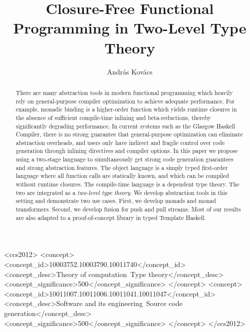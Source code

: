 \documentclass[acmsmall,screen,review,anonymous]{acmart}
\theoremstyle{remark}
\begin{document}
\title{Closure-Free Functional Programming in Two-Level Type Theory}

\author{András Kovács}

\begin{abstract}
There are many abstraction tools in modern functional programming which heavily
rely on general-purpose compiler optimization to achieve adequate
performance. For example, monadic binding is a higher-order function which
yields runtime closures in the absence of sufficient compile-time inlining and
beta-reductions, thereby significantly degrading performance. In current systems
such as the Glasgow Haskell Compiler, there is no strong guarantee that
general-purpose optimization can eliminate abstraction overheads, and users only
have indirect and fragile control over code generation through inlining
directives and compiler options. In this paper we propose using a two-stage
language to simultaneously get strong code generation guarantees and strong
abstraction features. The object language is a simply typed first-order language
where all function calls are statically known, and which can be compiled without
runtime closures. The compile-time language is a dependent type theory. The two
are integrated as a \emph{two-level type theory}. We develop abstraction tools
in this setting and demonstrate two use cases. First, we develop monads and
monad transformers. Second, we develop fusion for push and pull streams. Most of
our results are also adapted to a proof-of-concept library in typed Template
Haskell.
\end{abstract}

\begin{CCSXML}
<ccs2012>
   <concept>
       <concept_id>10003752.10003790.10011740</concept_id>
       <concept_desc>Theory of computation~Type theory</concept_desc>
       <concept_significance>500</concept_significance>
       </concept>
   <concept>
       <concept_id>10011007.10011006.10011041.10011047</concept_id>
       <concept_desc>Software and its engineering~Source code generation</concept_desc>
       <concept_significance>500</concept_significance>
       </concept>
 </ccs2012>
\end{CCSXML}
\end{document}
